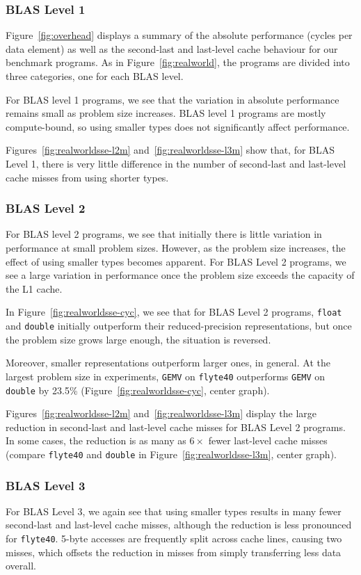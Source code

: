 \documentclass{sig-alternate-05-2015}
\begin{document}
\subsubsection{BLAS Level 1} Figure~\ref{fig:overhead} displays a summary of
the absolute performance (cycles per data element) as well as the second-last
and last-level cache behaviour for our benchmark programs. As in
Figure~\ref{fig:realworld}, the programs are divided into three categories, one
for each BLAS level.

For BLAS level 1 programs, we see that the variation in absolute performance
remains small as problem size increases. BLAS level 1 programs are mostly
compute-bound, so using smaller types does not significantly affect
performance.

Figures~\ref{fig:realworldsse-l2m} and~\ref{fig:realworldsse-l3m} show that,
for BLAS Level 1, there is very little difference in the number of second-last
and last-level cache misses from using shorter types.

\subsubsection{BLAS Level 2} For BLAS level 2 programs, we see that initially
there is little variation in performance at small problem sizes. However, as
the problem size increases, the effect of using smaller types becomes apparent.
For BLAS Level 2 programs, we see a large variation in performance once the
problem size exceeds the capacity of the L1 cache.

In Figure~\ref{fig:realworldsse-cyc}, we see that for BLAS Level 2 programs,
\texttt{float} and \texttt{double} initially outperform their reduced-precision
representations, but once the problem size grows large enough, the situation is
reversed.

Moreover, smaller representations outperform larger ones, in general. At the
largest problem size in experiments, \texttt{GEMV} on \texttt{flyte40}
outperforms \texttt{GEMV} on \texttt{double} by 23.5\%
(Figure~\ref{fig:realworldsse-cyc}, center graph).

Figures~\ref{fig:realworldsse-l2m} and~\ref{fig:realworldsse-l3m} display the
large reduction in second-last and last-level cache misses for BLAS Level 2
programs. In some cases, the reduction is as many as $6\times$ fewer last-level
cache misses (compare \texttt{flyte40} and \texttt{double} in
Figure~\ref{fig:realworldsse-l3m}, center graph).

\subsubsection{BLAS Level 3} For BLAS Level 3, we again see that using smaller
types results in many fewer second-last and last-level cache misses, although
the reduction is less pronounced for \texttt{flyte40}. 5-byte accesses are
frequently split across cache lines, causing two misses, which offsets the
reduction in misses from simply transferring less data overall.
\end{document}
